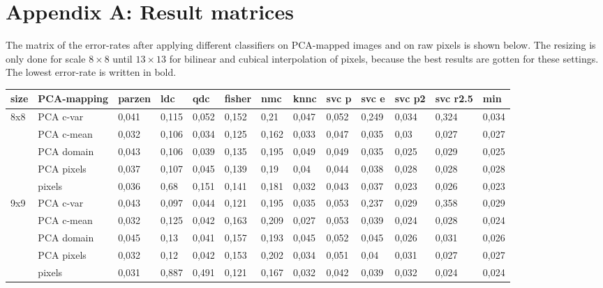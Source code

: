 \documentclass{article}
\begin{document}
\section{Appendix A: Result matrices}

The matrix of the error-rates after applying different classifiers on PCA-mapped images and on raw pixels is shown below. The resizing is only done for scale $8 \times 8$ until $13 \times 13$ for bilinear and cubical interpolation of pixels, because the best results are gotten for these settings. The lowest error-rate is written in bold.

\begin{table}[H]
  \small
  \centering
    \begin{tabular}{l|l|llllllllll|l|}
    \hline
    \textbf{size} & \textbf{PCA-mapping} & \textbf{parzen} & \textbf{ldc} & \textbf{qdc} & \textbf{fisher} & \textbf{nmc} & \textbf{knnc} & \textbf{svc p} & \textbf{svc e} & \textbf{svc p2} & \textbf{svc r2.5} & \textbf{min} \\
    \hline \hline
    8x8   & PCA c-var & 0,041 & 0,115 & 0,052 & 0,152 & 0,21  & 0,047 & 0,052 & 0,249 & 0,034 & 0,324 & 0,034 \\
          & PCA c-mean & 0,032 & 0,106 & 0,034 & 0,125 & 0,162 & 0,033 & 0,047 & 0,035 & 0,03  & 0,027 & 0,027 \\
          & PCA domain & 0,043 & 0,106 & 0,039 & 0,135 & 0,195 & 0,049 & 0,049 & 0,035 & 0,025 & 0,029 & 0,025 \\
          & PCA pixels & 0,037 & 0,107 & 0,045 & 0,139 & 0,19  & 0,04  & 0,044 & 0,038 & 0,028 & 0,028 & 0,028 \\
          & pixels & 0,036 & 0,68  & 0,151 & 0,141 & 0,181 & 0,032 & 0,043 & 0,037 & 0,023 & 0,026 & 0,023 \\ \hline
    9x9   & PCA c-var & 0,043 & 0,097 & 0,044 & 0,121 & 0,195 & 0,035 & 0,053 & 0,237 & 0,029 & 0,358 & 0,029 \\
          & PCA c-mean & 0,032 & 0,125 & 0,042 & 0,163 & 0,209 & 0,027 & 0,053 & 0,039 & 0,024 & 0,028 & 0,024 \\
          & PCA domain & 0,045 & 0,13  & 0,041 & 0,157 & 0,193 & 0,045 & 0,052 & 0,045 & 0,026 & 0,031 & 0,026 \\
          & PCA pixels & 0,032 & 0,12  & 0,042 & 0,153 & 0,202 & 0,034 & 0,051 & 0,04  & 0,031 & 0,027 & 0,027 \\
          & pixels & 0,031 & 0,887 & 0,491 & 0,121 & 0,167 & 0,032 & 0,042 & 0,039 & 0,032 & 0,024 & 0,024 \\ \hline

\end{tabular}
\end{table}
\end{document}
